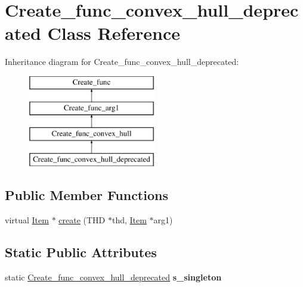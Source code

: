 \hypertarget{classCreate__func__convex__hull__deprecated}{}\section{Create\+\_\+func\+\_\+convex\+\_\+hull\+\_\+deprecated Class Reference}
\label{classCreate__func__convex__hull__deprecated}
Inheritance diagram for Create\+\_\+func\+\_\+convex\+\_\+hull\+\_\+deprecated\+:\begin{figure}[H]
\begin{center}
\leavevmode
\includegraphics[height=4.000000cm]{classCreate__func__convex__hull__deprecated}
\end{center}
\end{figure}
\subsection*{Public Member Functions}
\begin{DoxyCompactItemize}
\item 
virtual \mbox{\hyperlink{classItem}{Item}} $\ast$ \mbox{\hyperlink{classCreate__func__convex__hull__deprecated_adf24039896c580d52297e101450255f5}{create}} (T\+HD $\ast$thd, \mbox{\hyperlink{classItem}{Item}} $\ast$arg1)
\end{DoxyCompactItemize}
\subsection*{Static Public Attributes}
\begin{DoxyCompactItemize}
\item 
\mbox{\label{classCreate__func__convex__hull__deprecated_ad995cab227289e7e8cec182bc8527976}} 
static \mbox{\hyperlink{classCreate__func__convex__hull__deprecated}{Create\+\_\+func\+\_\+convex\+\_\+hull\+\_\+deprecated}} {\bfseries s\+\_\+singleton}
\end{DoxyCompactItemize}
